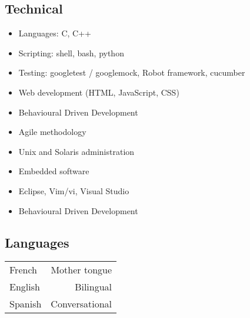 \documentclass{cv}
\begin{document}
\subsection{Technical}
\begin{itemize}
    \item {Languages: C, C++}
    \item {Scripting: shell, bash, python}
    \item {Testing: googletest / googlemock, Robot framework, cucumber}
    \item {Web development (HTML, JavaScript, CSS)}
    \item {Behavioural Driven Development}
    \item {Agile methodology}
    \item {Unix and Solaris administration}
    \item {Embedded software}
    \item {Eclipse, Vim/vi, Visual Studio}
    \item {Behavioural Driven Development}
\end{itemize}

\subsection{Languages}
\begin{tabular}{L!{\VRule}R}
French&Mother tongue\\
English&Bilingual\\
Spanish&Conversational\\
\end{tabular}
\end{document}
